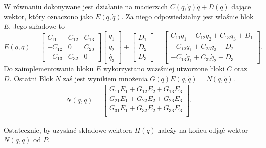 \documentclass[eng,printmode]{mgr}
\begin{document}
W równaniu dokonywane jest działanie na macierzach $C(q, \dot{q})\dot{q} + D(q)$ dające wektor, który oznaczono jako $E(q,\dot{q})$. Za niego odpowiedzialny jest właśnie blok $E$. Jego składowe to
$$
E(q, \dot{q})=\left[
      \begin{array}{ccc}
         C_{11} & C_{12} & C_{13}\\ 
         -C_{12} &0 & C_{23}\\
         -C_{13} & C_{32} & 0
         \end{array}
      \right]\left[
      \begin{array}{c}
      \dot{q_{1}} \\
         \dot{q_{2}} \\
         \dot{q_{3}}
         \end{array}
      \right]+\left[
      \begin{array}{c}
      D_1 \\
         D_2 \\
         D_3
         \end{array}
      \right] =    \left[
      \begin{array}{c}
      C_{11}\dot{q}_1+C_{12}\dot{q}_2+C_{13}\dot{q}_3+D_1 \\
        -C_{12}\dot{q}_1+C_{23}\dot{q}_3+D_2\\
         -C_{13}\dot{q}_1+C_{32}\dot{q}_2+D_3
         \end{array}
      \right].
      $$
Do zaimplementowania bloku $E$ wykorzystano wcześniej utworzone bloki $C$ oraz $D$. Ostatni Blok $N$ zaś jest wynikiem mnożenia $G(q)E(q,\dot{q})=N(q, \dot{q})$.
\begin{eqnarray}
N(q, \dot{q})=\left[
      \begin{array}{c}
      G_{11}E_1+G_{12}E_2+G_{13}E_3 \\
     G_{21}E_1+G_{22}E_2+G_{23}E_3 \\
          G_{31}E_1+G_{32}E_2+G_{33}E_3 \\
         \end{array}
      \right].
\end{eqnarray}


Ostatecznie, by uzyskać składowe wektora $H(q)$ należy na końcu odjąć wektor $N(q, \dot{q})$ od $P$. 
\end{document}
